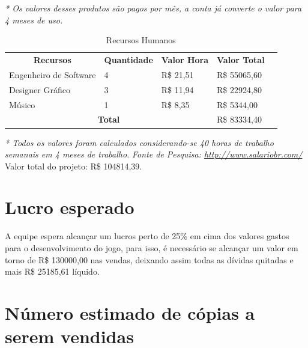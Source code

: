 \documentclass[11pt]{article} %
\begin{document}
\textit{* Os valores desses produtos são pagos por mês, a conta já converte o valor para 4 meses de uso.}
\newpage

\begin{table}[h]
\begin{tabular}{|l|l|l|l|l}
\cline{1-4}
\multicolumn{1}{|c|}{\textbf{Recursos}} & \multicolumn{1}{c|}{\textbf{Quantidade}} & \multicolumn{1}{c|}{\textbf{Valor Hora}} & \multicolumn{1}{c|}{\textbf{Valor Total}} &  \\ \cline{1-4}
Engenheiro de Software                  & 4                                        & R\$ 21,51                                & R\$ 55065,60                              &  \\ \cline{1-4}
Designer Gráfico                        & 3                                        & R\$ 11,94                                & R\$ 22924,80                              &  \\ \cline{1-4}
Músico                                  & 1                                        & R\$ 8,35                                 & R\$ 5344,00                               &  \\ \cline{1-4}
\multicolumn{3}{|c|}{\textbf{Total}}                                                                                          & R\$ 83334,40                              &  \\ \cline{1-4}
\end{tabular}
\caption {Recursos Humanos}
\end{table}

\textit{* Todos os valores foram calculados considerando-se 40 horas de trabalho semanais em 4 meses de trabalho.}
\textit{Fonte de Pesquisa: \url{http://www.salariobr.com/}}
\\

Valor total do projeto: R\$ 104814,39.

\section{Lucro esperado}

A equipe espera alcançar um lucros perto de 25\% em cima dos valores gastos para o desenvolvimento do jogo, para isso, é necessário se alcançar um valor em torno de R\$ 130000,00 nas vendas, deixando assim todas as dívidas quitadas e mais R\$ 25185,61 líquido.

\section{Número estimado de cópias a serem vendidas}
\end{document}
